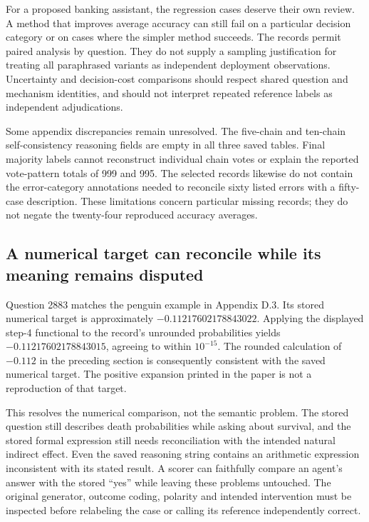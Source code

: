 For a proposed banking assistant, the regression cases deserve their own
review. A method that improves average accuracy can still fail on a particular
decision category or on cases where the simpler method succeeds. The records
permit paired analysis by question. They do not supply a sampling justification
for treating all paraphrased variants as independent deployment observations.
Uncertainty and decision-cost comparisons should respect shared question and
mechanism identities, and should not interpret repeated reference labels as
independent adjudications.

Some appendix discrepancies remain unresolved. The five-chain and ten-chain
self-consistency reasoning fields are empty in all three saved tables. Final
majority labels cannot reconstruct individual chain votes or explain the
reported vote-pattern totals of 999 and 995. The selected records likewise do
not contain the error-category annotations needed to reconcile sixty listed
errors with a fifty-case description. These limitations concern particular
missing records; they do not negate the twenty-four reproduced accuracy
averages.\citep{exec21_prophets_repo,exec21_prophets_repo_reference}

\subsection{A numerical target can reconcile while its meaning remains disputed}
\label{exec21:prophetsrepo-reference}
Question 2883 matches the penguin example in Appendix D.3. Its stored numerical
target is approximately $-0.11217602178843022$. Applying the displayed
step-4 functional to the record's unrounded probabilities yields
$-0.11217602178843015$, agreeing to within $10^{-15}$. The rounded calculation
of $-0.112$ in the preceding section is consequently consistent with the saved
numerical target. The positive expansion printed in the paper is not a
reproduction of that target.\citep{exec21_prophets_repo_reference}

This resolves the numerical comparison, not the semantic problem. The stored
question still describes death probabilities while asking about survival, and
the stored formal expression still needs reconciliation with the intended
natural indirect effect. Even the saved reasoning string contains an arithmetic
expression inconsistent with its stated result. A scorer can faithfully compare
an agent's answer with the stored ``yes'' while leaving these problems untouched.
The original generator, outcome coding, polarity and intended intervention
must be inspected before relabeling the case or calling its reference
independently correct.\citep{exec21_prophets_repo}

